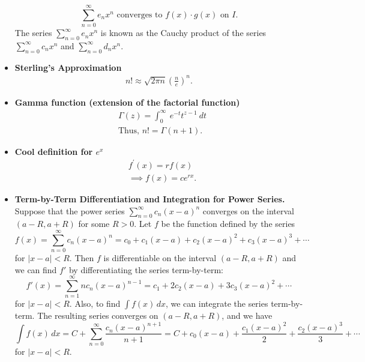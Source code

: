 \documentclass{report}
\begin{document}
\begin{itemize}
\[                    \sum_{n=0}^{\infty} e_n x^n \text{ converges to } f(x) \cdot g(x) \text{ on } I.
                \]
                The series \(\sum_{n=0}^{\infty} e_n x^n\) is known as the Cauchy product of the series \(\sum_{n=0}^{\infty} c_n x^n\) and \(\sum_{n=0}^{\infty} d_n x^n\).
            \item \textbf{Sterling's Approximation}
                \begin{align*}
                    n! \approx \sqrt{2\pi n}\left(\frac{n}{e}\right)^{n}
                .\end{align*}
            \item \textbf{Gamma function (extension of the factorial function)}
                \begin{align*}
                     &\Gamma(z) = \int_{0}^{\infty}\ e^{-t}t^{z-1}\ dt \\
                     &\text{Thus, } n! = \Gamma(n+1)
                 .\end{align*}
             \item \textbf{Cool definition for $e^{x}$}
                 \begin{align*}
                    &f^{\prime}(x) = rf(x) \\
                    &\implies f(x) = ce^{rx}
                .\end{align*}
            \item \textbf{Term-by-Term Differentiation and Integration for Power Series.}
                Suppose that the power series $\sum_{n=0}^{\infty} c_n (x - a)^n$ converges on the interval $(a - R, a + R)$ for some $R > 0$. Let $f$ be the function defined by the series
                \[
                    f(x) = \sum_{n=0}^{\infty} c_n (x - a)^n = c_0 + c_1(x - a) + c_2(x - a)^2 + c_3(x - a)^3 + \cdots
                \]
                for $|x - a| < R$. Then $f$ is differentiable on the interval $(a - R, a + R)$ and we can find $f'$ by differentiating the series term-by-term:
                \[
                    f'(x) = \sum_{n=1}^{\infty} n c_n (x - a)^{n-1} = c_1 + 2c_2(x - a) + 3c_3(x - a)^2 + \cdots
                \]
                for $|x - a| < R$. Also, to find $\int f(x) \, dx$, we can integrate the series term-by-term. The resulting series converges on $(a - R, a + R)$, and we have
                \[
                    \int f(x) \, dx = C + \sum_{n=0}^{\infty} \frac{c_n (x - a)^{n+1}}{n+1} = C + c_0(x - a) + \frac{c_1(x - a)^2}{2} + \frac{c_2(x - a)^3}{3} + \cdots
                \]
                for $|x - a| < R$.
                \bigbreak \noindent 

\end{itemize}
\end{document}
